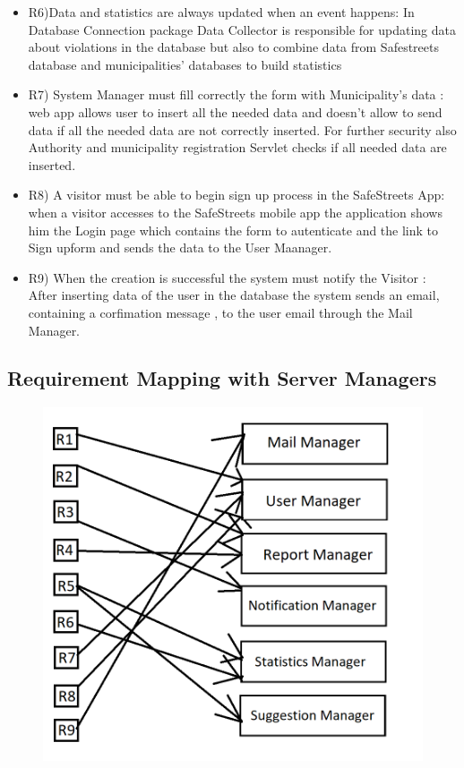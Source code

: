 \begin{itemize}
 \item R6)Data and statistics are always updated when an event happens: In Database Connection package Data Collector is responsible for updating data about violations in the database but also to combine data from Safestreets database and municipalities' databases to build statistics
\item R7) System Manager must fill correctly the form with Municipality’s data : web app allows user to insert all the needed data and doesn't allow to send data if all the needed data are not correctly inserted. For further security also Authority and municipality registration Servlet checks if all needed data are inserted.
 \item R8) A visitor must be able to begin sign up process in the SafeStreets App: when a visitor accesses to the SafeStreets mobile app the application shows him the Login page which contains the form to autenticate and the link to Sign upform and sends the data to the User Maanager.
 \item R9) When the creation is successful the system must notify the Visitor : After inserting data of the user in the database the system sends an email, containing a corfimation message , to the user email through the Mail Manager.

\end{itemize}
\subsection{Requirement Mapping with Server Managers}

\begin{figure}[H]
\centering
\includegraphics[width=\textwidth]{Images/AAAAAAAAAAAAAAAAAAAAAAAAAA.png}
\end{figure}
